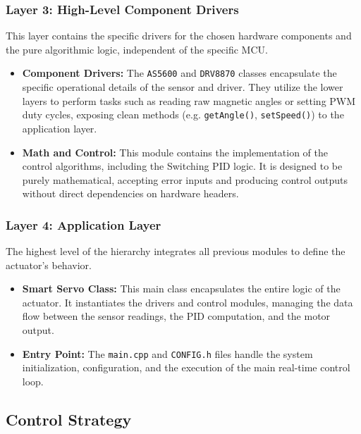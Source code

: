 \subsubsection{Layer 3: High-Level Component Drivers}

This layer contains the specific drivers for the chosen hardware components and the pure algorithmic logic,
independent of the specific MCU.

\begin{itemize}
    \item \textbf{Component Drivers:} The \texttt{AS5600} and \texttt{DRV8870} classes encapsulate the
        specific operational details of the sensor and driver. They utilize the lower layers to perform tasks
        such as reading raw magnetic angles or setting PWM duty cycles, exposing clean methods (e.g.
        \texttt{getAngle()}, \texttt{setSpeed()}) to the application layer.
    \item \textbf{Math and Control:} This module contains the implementation of the control algorithms,
        including the Switching PID logic. It is designed to be purely mathematical, accepting error inputs
        and producing control outputs without direct dependencies on hardware headers.
\end{itemize}


\subsubsection{Layer 4: Application Layer}

The highest level of the hierarchy integrates all previous modules to define the actuator's behavior.

\begin{itemize}
    \item \textbf{Smart Servo Class:} This main class encapsulates the entire logic of the actuator. It
        instantiates the drivers and control modules, managing the data flow between the sensor readings,
        the PID computation, and the motor output.
    \item \textbf{Entry Point:} The \texttt{main.cpp} and \texttt{CONFIG.h} files handle the system
        initialization, configuration, and the execution of the main real-time control loop.
\end{itemize}


\subsection{Control Strategy}

